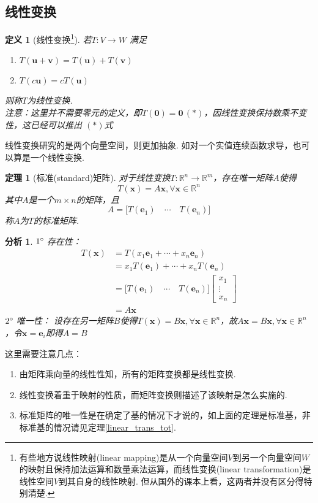 \documentclass[11pt,UTF8]{ctexart}
\newtheorem{theorem}{定理}
\newtheorem{definition}{定义}
\newtheorem*{analysis}{分析}
\def\vx{\mathbf{x}}
\def\rn{\mathbb{R}^n}
\newcommand{\vb}[1]{\mathbf{#1}}
\begin{document}
\subsection{线性变换}
\begin{definition}[线性变换\protect\footnote{有些地方说线性映射(linear mapping)是从一个向量空间$V$到另一个向量空间$W$的映射且保持加法运算和数量乘法运算，而线性变换(linear transformation)是线性空间$V$到其自身的线性映射. 但从国外的课本上看，这两者并没有区分得特别清楚.}]
若$T:V\to W$ 满足
\begin{enumerate}
	\itemsep -3pt
	\item $T(\vb{u}+\vb{v})=T(\vb{u})+T(\vb{v})$
	\item $T(c\vb{u})=cT(\vb{u})$
\end{enumerate}
则称$T$为线性变换.\\
注意：这里并不需要零元的定义，即$T(\mathbf{0})=\mathbf{0}\,(*)$，因线性变换保持数乘不变性，这已经可以推出 $(*)$式
\end{definition}
\par 线性变换研究的是两个向量空间，则更加抽象. 如对一个实值连续函数求导，也可以算是一个线性变换.
\begin{theorem}[标准(standard)矩阵]
对于线性变换$T:\rn\to\mathbb{R}^m$，存在唯一矩阵$A$使得
\[T(\vx)=A\vx,\forall\vx\in\rn\]
其中$A$是一个$m\times n$的矩阵，且
\[A=\Big[T(\vb{e}_1)\quad\cdots\quad T(\vb{e}_n)\Big]\]
称$A$为$T$的标准矩阵.
\end{theorem}
\begin{analysis}
$1\degree\;$存在性：
\[\begin{aligned}T(\vx) &= T(x_1\vb{e}_1+\cdots+x_n\vb{e}_n)\\
&= x_1T(\vb{e}_1)+\cdots+x_nT(\vb{e}_n)\\
&= \Big[T(\vb{e}_1)\quad\cdots\quad T(\vb{e}_n)\Big]\begin{bmatrix}x_1\\\vdots\\x_n\end{bmatrix}\\
&= A\vx
\end{aligned}\]
$2\degree\;$唯一性：
设存在另一矩阵$B$使得$T(\vx)=B\vx,\forall\vx\in\rn$，故$A\vx=B\vx,\forall\vx\in\rn$，令$\vx=\vb{e}_i$即得$A=B$
\end{analysis}
这里需要注意几点：
\begin{enumerate}
	\itemsep -3pt
	\item 由矩阵乘向量的线性性知，所有的矩阵变换都是线性变换.
	\item 线性变换着重于映射的性质，而矩阵变换则描述了该映射是怎么实施的.
	\item 标准矩阵的唯一性是在确定了基的情况下才说的，如上面的定理是标准基，非标准基的情况请见定理\ref{linear_trans_tot}.
\end{enumerate}
\end{document}
